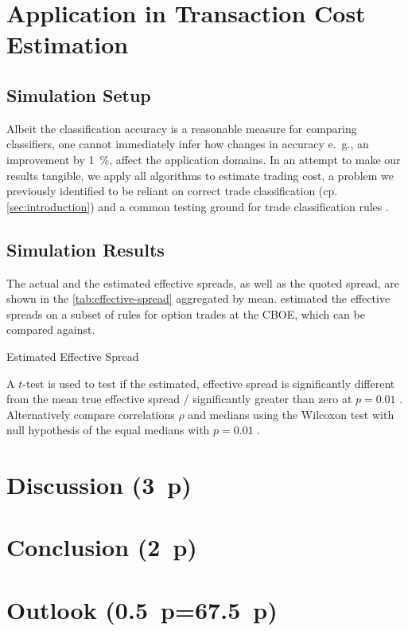 \newpage
\section{Application in Transaction Cost Estimation}\label{sec:application}
\subsection{Simulation Setup}\label{sec:simulation-setup}

Albeit the classification accuracy is a reasonable measure for comparing classifiers, one cannot immediately infer how changes in accuracy e.~g., an improvement by \SI{1}{\percent}, affect the application domains. In an attempt to make our results tangible, we apply all algorithms to estimate trading cost, a problem we previously identified to be reliant on correct trade classification (cp. \cref{sec:introduction}) and a common testing ground for trade classification rules \autocites[cp.][541]{ellisAccuracyTradeClassification2000}[][569]{finucaneDirectTestMethods2000}[][896--897]{savickasInferringDirectionOption2003}.



\subsection{Simulation Results}\label{sec:simulation-results}

The actual and the estimated effective spreads, as well as the quoted spread, are shown in the \cref{tab:effective-spread} aggregated by mean. \textcite[][896--897]{savickasInferringDirectionOption2003} estimated the effective spreads on a subset of rules for option trades at the \gls{CBOE}, which can be compared against.

\begin{table}[H]
    \centering
    
    \caption[Estimated Effective Spread]{Estimated Effective Spread}
    \label{tab:effective-spread}
\end{table}

A $t$-test is used to test if the estimated, effective spread is significantly different from the mean true effective spread / significantly greater than zero at $p=0.01$ \autocite[cp.][570]{finucaneDirectTestMethods2000}. Alternatively compare correlations $\rho$ and medians using the Wilcoxon test with null hypothesis of the equal medians with $p=0.01$ \autocite[cp.][12]{theissenTestAccuracyLee2000}.

\newpage
\section{Discussion (3~p)}\label{sec:discussion}

\newpage
\section{Conclusion (2~p)}\label{sec:conclusion}

\newpage
\section{Outlook (0.5~p=67.5~p)}\label{sec:outlook}


